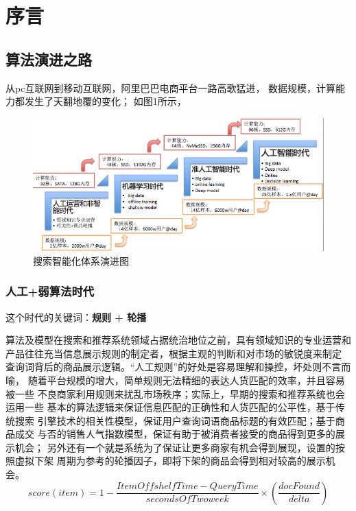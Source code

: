 
\chapter{序言}
\thispagestyle{empty}

\setlength{\fboxrule}{0pt}\setlength{\fboxsep}{0cm}
\noindent\shadowbox{
\begin{tcolorbox}[arc=0mm,colback=lightblue,colframe=darkblue,title=学习目标与要求]

\end{tcolorbox}}
\setlength{\fboxrule}{1pt}\setlength{\fboxsep}{4pt}

\section{算法演进之路}

从pc互联网到移动互联网，阿里巴巴电商平台一路高歌猛进，
数据规模，计算能力都发生了天翻地覆的变化；
如图1所示，
\begin{figure}[h]
\centering
\includegraphics[totalheight=2.0in]{fig/searchAlgoRoadmap.png}
\caption{搜索智能化体系演进图} \label{fig:gansamples}
\end{figure}

\subsection{人工+弱算法时代} 
这个时代的关键词：\textbf{规则 + 轮播}

算法及模型在搜索和推荐系统领域占据统治地位之前，具有领域知识的专业运营和
产品往往充当信息展示规则的制定者，根据主观的判断和对市场的敏锐度来制定
查询词背后的商品展示逻辑。“人工规则”的好处是容易理解和操控，坏处则不言而喻，
随着平台规模的增大，简单规则无法精细的表达人货匹配的效率，并且容易被一些
不良商家利用规则来扰乱市场秩序；实际上，早期的搜索和推荐系统也会运用一些
基本的算法逻辑来保证信息匹配的正确性和人货匹配的公平性，基于传统搜索
引擎技术的相关性模型，保证用户查询词语商品标题的有效匹配；基于商品成交
与否的销售人气指数模型，保证有助于被消费者接受的商品得到更多的展示机会；
另外还有一个就是系统为了保证让更多商家有机会得到展现，设置的按照虚拟下架
周期为参考的轮播因子，即将下架的商品会得到相对较高的展示机会。
$$
	score(item)=1-\frac{ItemOffshelfTime-QueryTime}{secondsOfTwoweek}\times(\frac{docFound}{delta})
$$


